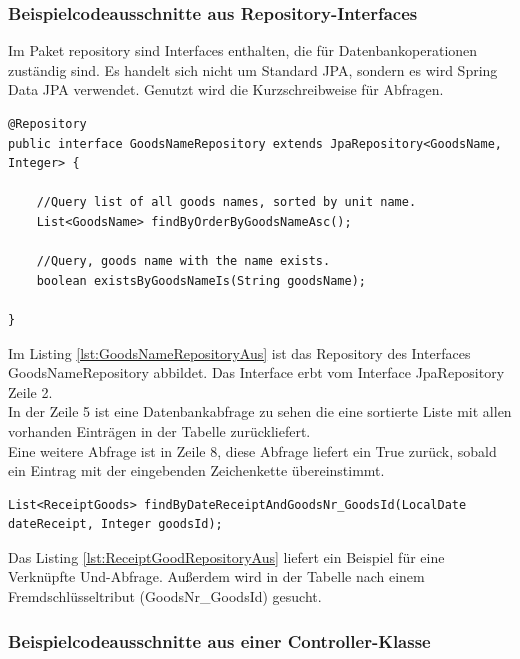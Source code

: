\subsubsection{Beispielcodeausschnitte aus Repository-Interfaces}

Im Paket repository sind Interfaces enthalten, die für Datenbankoperationen zuständig sind. Es handelt sich nicht um Standard JPA, sondern es wird Spring Data JPA verwendet. Genutzt wird die Kurzschreibweise für Abfragen.

\lstset{language=java}
\begin{lstlisting}[frame=tb, caption={Das Listing zeigt einen Ausschnitt aus dem Interface GoodsNameRepository}, label={lst:GoodsNameRepositoryAus}]
@Repository
public interface GoodsNameRepository extends JpaRepository<GoodsName, Integer> {
	
	//Query list of all goods names, sorted by unit name.
	List<GoodsName> findByOrderByGoodsNameAsc();
	
	//Query, goods name with the name exists.
	boolean existsByGoodsNameIs(String goodsName);
	
}
\end{lstlisting}

Im Listing \ref{lst:GoodsNameRepositoryAus} ist das Repository des Interfaces GoodsNameRepository abbildet. Das Interface erbt vom Interface JpaRepository Zeile 2. \\
In der Zeile 5 ist eine Datenbankabfrage zu sehen die eine sortierte Liste mit allen vorhanden Einträgen in der Tabelle zurückliefert. 
\\
Eine weitere Abfrage ist in Zeile 8, diese Abfrage liefert ein True zurück, sobald ein Eintrag mit der eingebenden Zeichenkette übereinstimmt. 
\\
\lstset{language=java}
\begin{lstlisting}[frame=tb, caption={Das Listing zeigt einen Ausschnitt aus dem Interface ReceiptGoodRepository}, label={lst:ReceiptGoodRepositoryAus}]
List<ReceiptGoods> findByDateReceiptAndGoodsNr_GoodsId(LocalDate dateReceipt, Integer goodsId);
\end{lstlisting}

Das Listing \ref{lst:ReceiptGoodRepositoryAus} liefert ein Beispiel für eine Verknüpfte Und-Abfrage. Außerdem wird in der Tabelle nach einem Fremdschlüsseltribut (GoodsNr\_GoodsId) gesucht.

\subsubsection{Beispielcodeausschnitte aus einer Controller-Klasse}


